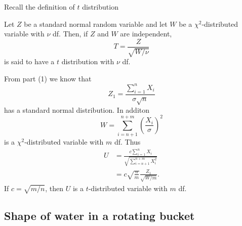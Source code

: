 \documentclass[10pt]{article}
\begin{document}
\begin{exercise}
\begin{enumerate}
			\begin{solution}
				Recall the definition of $t$ distribution
				\begin{definition}
					Let $Z$ be a standard normal random variable and let $W$ be a $\chi^2$-distributed variable with $\nu$ df. Then, if $Z$ and $W$ are independent,
					\begin{equation*}
						T = \frac{Z}{\sqrt{W/\nu}}
					\end{equation*}
					is said to have a $t$ distribution with $\nu$ df.
				\end{definition}
				From part (1) we know that
				\begin{equation}
					Z_1 = \frac{\sum_{i=1}^n X_i}{\sigma \sqrt{n}}
				\end{equation}
				has a standard normal distribution. In additon
				\begin{equation}
					W = \sum_{i=n+1}^{n+m} (\frac{X_i}{\sigma})^2
				\end{equation}
				is a $\chi^2$-distributed variable with $m$ df. Thus
				\begin{align*}
					U &= \frac{c \sum_{i=1}^n X_i}{\sqrt{\sum_{i=n+1}^{n+m} X_i^2}} \\
					&= c \sqrt{\frac{n}{m}} \frac{Z_1}{\sqrt{W/m}}.
				\end{align*}
				If $c = \sqrt{m/n}$, then $U$ is a $t$-distributed variable with $m$ df.
			\end{solution}
		\end{enumerate}
	\end{exercise}

	\subsection{Shape of water in a rotating bucket}
\end{document}
